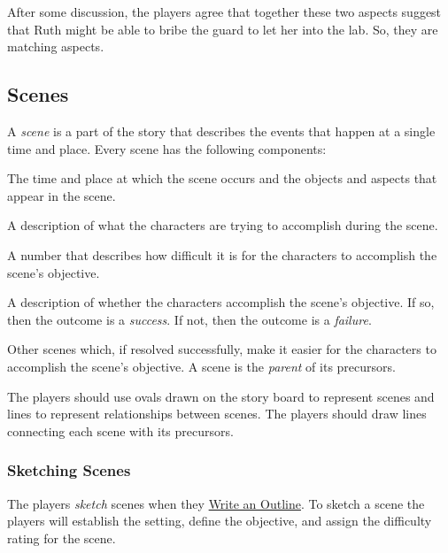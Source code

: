 \documentclass[12pt, a5paper, parskip=half-]{scrartcl}
\begin{document}
After some discussion, the players agree that together these two aspects suggest that Ruth might be able to bribe the guard to let her into the lab.  So, they are matching aspects.

\newpage

\subsection*{Scenes} \label{subsection:scenes}
A \emph{scene} is a part of the story that describes the events that happen at a single time and place.
Every scene has the following components:
\begin{description}[labelindent=0.25cm, leftmargin=\widthof{\hspace{0.25cm}\textbullet\space}, font=\normalfont\textbullet\bfseries\space]
  \item[Setting:]
  The time and place at which the scene occurs and the objects and aspects that appear in the scene.
  \item[Objective:]
    A description of what the characters are trying to accomplish during the scene.
  \item[Difficulty Rating:]
    A number that describes how difficult it is for the characters to accomplish the scene's objective.
  \item[Outcome:]
    A description of whether the characters accomplish the scene's objective. If so, then the outcome is a \emph{success}.  If not, then the outcome is a \emph{failure}.
  \item[Precursors:]
    Other scenes which, if resolved successfully, make it easier for the characters to accomplish the scene's objective.
    A scene is the \emph{parent} of its precursors.
\end{description} 

\bigskip

The players should use ovals drawn on the story board to represent scenes and lines to represent relationships between scenes.
The players should draw lines connecting each scene with its precursors.

\newpage

\subsubsection*{Sketching Scenes} \label{subsubsection:sketching-scenes}
The players \emph{sketch} scenes when they \hyperref[subsection:write-an-outline]{\cinzel \small Write an Outline}. 
To sketch a scene the players will establish the setting, define the objective, and assign the difficulty rating for the scene.
\end{document}
